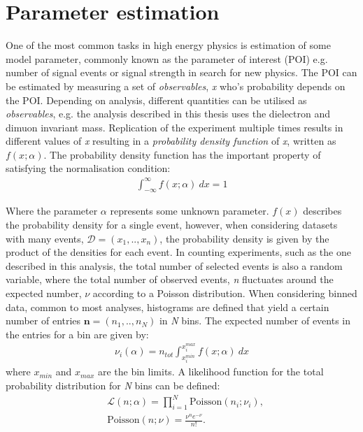\section{Parameter estimation}
One of the most common tasks in high energy physics is estimation of some model parameter, commonly known as the parameter of interest (POI) e.g. number of signal events or signal strength in search for new physics. The POI can be estimated by measuring a set of \emph{observables}, \emph{x} who's probability depends on the POI. Depending on analysis, different quantities can be utilised as \emph{observables}, e.g. the analysis described in this thesis uses the dielectron and dimuon invariant mass. Replication of the experiment multiple times results in different values of \emph{x} resulting in a \emph{probability density function} of \emph{x}, written as $f(x;\alpha)$. The probability density function has the important property of satisfying the normalisation condition:
\begin{equation}
    \begin{aligned}
        \int_{-\infty}^{\infty} f(x;\alpha)~dx = 1
    \end{aligned}
\end{equation}

Where the parameter $\alpha$ represents some unknown parameter. $f(x)$ describes the probability density for a single event, however, when considering datasets with many events, $\mathcal{D} = (x_1,..,x_n)$, the probability density is given by the product of the densities for each event. In counting experiments, such as the one described in this analysis, the total number of selected events is also a random variable, where the total number of observed events, \emph{n} fluctuates around the expected number, $\nu$ according to a Poisson distribution. When considering binned data, common to most analyses, histograms are defined that yield a certain number of entries $\textbf{n} = (n_1,..,n_N)$ in \emph{N} bins. The expected number of events in the entries for a bin are given by:
\begin{equation}
\begin{aligned}
    \nu_i(\alpha) = n_{tot}\int_{x_i^{min}}^{x_i^{max}} f(x;\alpha)~dx
\end{aligned}
\end{equation}
where $x_{min}$ and $x_{max}$ are the bin limits. A likelihood function for the total probability distribution for \emph{N} bins can be defined:
\begin{equation}
    \label{eq:poissL}
    \begin{aligned}
        & \mathcal{L}(n;\alpha) = \prod_{i=1}^{N}\mathrm{Poisson}(n_i;\nu_i), \\
        & \mathrm{Poisson}(n;\nu) = \frac{\nu^ne^{-\nu}}{n!}.
    \end{aligned}
\end{equation}

